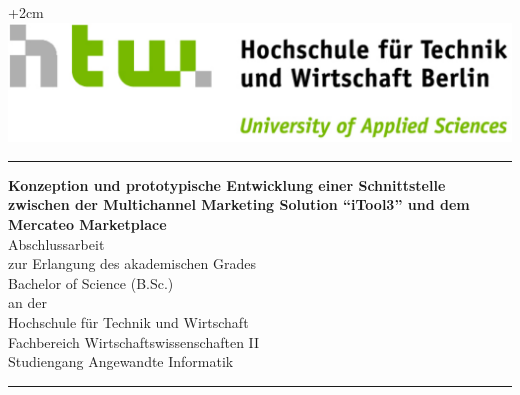 \documentclass[10pt,a4paper,bibliography=totocnumbered,listof=totocnumbered]{scrartcl}
\begin{document}

\renewcommand{\sectionmark}[1]{\markright{#1}}
\renewcommand{\leftmark}{\rightmark}
\pagestyle{fancy}
\lhead{}
\chead{}
\rhead{\thesection\space\contentsname}
\lfoot{}
\cfoot{}
\renewcommand{\headrulewidth}{1.0pt}
\renewcommand{\footrulewidth}{1.0pt}

\renewcommand{\thesection}{\Roman{section}}
\renewcommand{\theHsection}{\Roman{section}}

\thispagestyle{empty}
\begin{center}
		\vspace*{.2cm}
		\begin{flushright}
			\advance\rightskip+2cm
			\includegraphics[width=.4\textwidth]{img/HTW-quer-rgb.pdf} %
		\end{flushright}
	\vspace*{3cm}
	\vspace*{2cm}
	{\rule{\linewidth}{0.5mm}}
	

	
	\vspace*{0.5cm}
	\LARGE
	\textbf{Konzeption und prototypische Entwicklung einer Schnittstelle zwischen der Multichannel Marketing Solution \enquote{iTool3} und dem Mercateo Marketplace}\\
	\vspace*{0.6cm}
	\Large
	Abschlussarbeit\\
	\large
	\vspace*{0.3cm}
	zur Erlangung des akademischen Grades\\
	Bachelor of Science (B.Sc.)\\
	\vspace*{0.2cm}
	an der \\
		\vspace*{0.2cm}
	Hochschule für Technik und Wirtschaft\\
	Fachbereich Wirtschaftswissenschaften II\\
	Studiengang Angewandte Informatik \\
	\vspace*{0.5cm}
	{\rule{\linewidth}{0.5mm}}
	\vspace*{2cm}
	
	\vfill
	\end{center}
	
\end{document}
